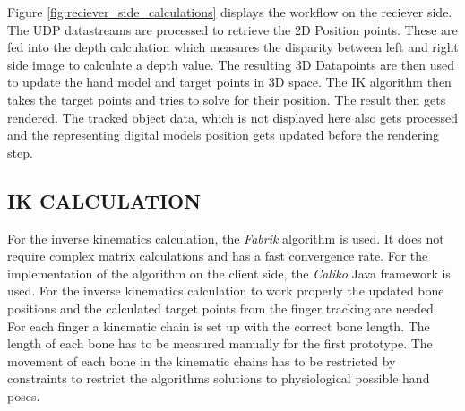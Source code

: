 Figure \ref{fig:reciever_side_calculations} displays the workflow on the reciever side. The UDP datastreams are processed to retrieve the 2D Position points. These are fed into the depth calculation which measures the disparity between left and right side image to calculate a depth value\cite{JernejMrovlje.2008,YasirDawoodSalman.2017,Tauer.2010}. The resulting 3D Datapoints are then used to update the hand model and target points in 3D space. The IK algorithm then takes the target points and tries to solve for their position. The result then gets rendered. The tracked object data, which is not displayed here also gets processed and the representing digital models position gets updated before the rendering step.
\subsection{IK CALCULATION}
For the inverse kinematics calculation, the \textit{Fabrik} algorithm is used. It does not require complex matrix calculations and has a fast convergence rate. For the implementation of the algorithm on the client side, the \textit{Caliko} Java framework\cite{Lansley.2016} is used. 
For the inverse kinematics calculation to work properly the updated bone positions and the calculated target points from the finger tracking are needed.
For each finger a kinematic chain is set up with the correct bone length. The length of each bone has to be measured manually for the first prototype. The movement of each bone in the kinematic chains has to be restricted by constraints to restrict the algorithms solutions to physiological possible hand poses.  